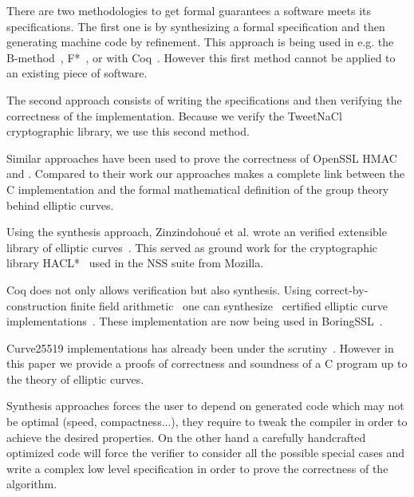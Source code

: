 There are two methodologies to get formal guarantees a software meets its
specifications.
The first one is by synthesizing a formal specification and then generating machine
code by refinement.
This approach is being used in e.g. the B-method~\cite{Abrial:1996:BAP:236705},
F*~\cite{DBLP:journals/corr/BhargavanDFHPRR17}, or with Coq~\cite{CpdtJFR}.
However this first method cannot be applied to an existing piece of software.

The second approach consists of writing the specifications and then verifying
the correctness of the implementation.
Because we verify the TweetNaCl cryptographic library, we use this second method.



Similar approaches have been used to prove the correctness of OpenSSL
HMAC~\cite{Beringer2015VerifiedCA} and . Compared to
their work our approaches makes a complete link between the C implementation and
the formal mathematical definition of the group theory behind elliptic curves.

Using the synthesis approach, Zinzindohou{\'{e}} et al. wrote an verified extensible
library of elliptic curves~\cite{Zinzindohoue2016AVE}. This served as ground work for the
cryptographic library HACL*~\cite{zinzindohoue2017hacl} used in the NSS suite from Mozilla.

Coq does not only allows verification but also synthesis.
Using correct-by-construction finite field arithmetic~\cite{Philipoom2018CorrectbyconstructionFF}
one can synthesize~\cite{Erbsen2016SystematicSO} certified elliptic curve
implementations~\cite{Erbsen2017CraftingCE}. These implementation are now being used in BoringSSL~\cite{fiat-crypto}.

Curve25519 implementations has already been under the scrutiny~\cite{Chen2014VerifyingCS}.
However in this paper we provide a proofs of correctness and soundness of a C program up to
the theory of elliptic curves.

Synthesis approaches forces the user to depend on generated code which may not
be optimal (speed, compactness...), they require to tweak the compiler in order
to achieve the desired properties. On the other hand a carefully handcrafted
optimized code will force the verifier to consider all the possible special cases
and write a complex low level specification in order to prove the correctness of
the algorithm.

